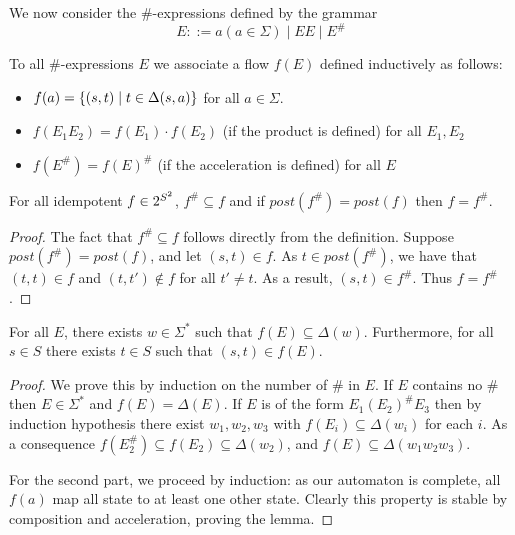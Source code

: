 \documentclass{article}
\begin{document}
We now consider the $\#$-expressions defined by the grammar \[E ::= a (a \in \Sigma) \mid EE \mid E^\#\]

To all $\#$-expressions $E$ we associate a flow $f(E)$ defined inductively as follows:

\begin{itemize}
	\item $f(a) = \{ (s,t) \mid t \in \Delta(s,a) \}$ for all $a \in \Sigma$.
	
	\item $f(E_1 E_2) = f(E_1)\cdot f(E_2)$ (if the product is defined) for all $E_1, E_2$ 
	
	\item $f(E^\#) = f(E)^\#$ (if the acceleration is defined) for all $E$ 
\end{itemize}

\begin{lemma}
	\label{lem:post-idem}
	For all idempotent $f \in 2^{S^2}$, $f^\# \subseteq f$ and if $post(f^\#) = post(f)$ then $f = f^\#$.  
\end{lemma}

\begin{proof}
	The fact that $f^\# \subseteq f$ follows directly from the definition.
	Suppose $post(f^\#) = post(f)$, and let $(s,t) \in f$. 
	As $t \in post(f^\#)$, we have that $(t,t) \in f$ and $(t,t') \notin f$ for all $t'\neq t$. As a result, $(s,t) \in f^\#$. 
	Thus $f = f^\#$.
\end{proof}

\begin{lemma}
	\label{lem:word-exp}
	For all $E$, there exists $w \in \Sigma^*$ such that $f(E) \subseteq \Delta(w)$.
	Furthermore, for all $s \in S$ there exists $t \in S$ such that $(s,t) \in f(E)$.
\end{lemma}

\begin{proof}
	We prove this by induction on the number of $\#$ in $E$.
	If $E$ contains no $\#$ then $E \in \Sigma^*$ and $f(E) = \Delta(E)$.
	If $E$ is of the form $E_1(E_2)^\# E_3$ then by induction hypothesis there exist $w_1, w_2, w_3$ with $f(E_i) \subseteq \Delta(w_i)$ for each $i$.
	As a consequence $f(E_2^\#) \subseteq f(E_2) \subseteq \Delta(w_2)$, and $f(E) \subseteq \Delta(w_1w_2w_3)$.
	
	For the second part, we proceed by induction: as our automaton is complete, all $f(a)$ map all state to at least one other state.
	Clearly this property is stable by composition and acceleration, proving the lemma.
\end{proof}
\end{document}
